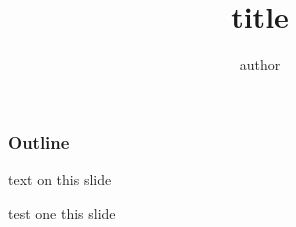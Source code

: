 \documentclass{beamer}
\author{author}
\title{title}
\institute{institute}
\begin{document}
\begin{frame}
\frametitle{Outline}
text on this slide
\end{frame}

\begin{frame}
test one this slide
\end{frame}
\end{document}

